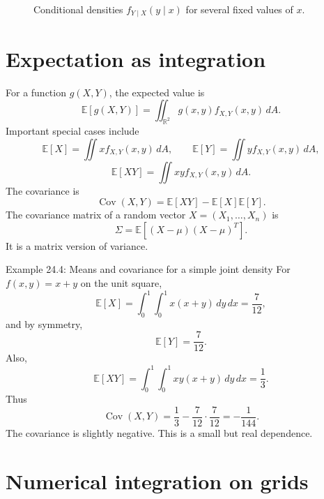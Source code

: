 \documentclass[11pt,oneside]{book}
\newcommand{\R}{\mathbb R}
\newcommand{\E}{\mathbb E}
\newcommand{\Cov}{\operatorname{Cov}}
\newcommand{\dd}{\,d}
\begin{document}
\begin{figure}[H]
\centering
{}
\caption{Conditional densities $f_{Y\mid X}(y\mid x)$ for several fixed values of $x$.}
\end{figure}

\section{Expectation as integration}

For a function $g(X,Y)$, the expected value is
\[
\E[g(X,Y)]=\iint_{\R^2}g(x,y)f_{X,Y}(x,y)\dd A.
\]
Important special cases include
\[
\E[X]=\iint x f_{X,Y}(x,y)\dd A,
\qquad
\E[Y]=\iint y f_{X,Y}(x,y)\dd A,
\]
\[
\E[XY]=\iint xy f_{X,Y}(x,y)\dd A.
\]
The covariance is
\[
\Cov(X,Y)=\E[XY]-\E[X]\E[Y].
\]
The covariance matrix of a random vector $X=(X_1,\ldots,X_n)$ is
\[
\Sigma=\E[(X-\mu)(X-\mu)^T].
\]
It is a matrix version of variance.

\begin{examplebox}{Example 24.4: Means and covariance for a simple joint density}
For $f(x,y)=x+y$ on the unit square,
\[
\E[X]=\int_0^1\int_0^1 x(x+y)\dd y\dd x=\frac{7}{12},
\]
and by symmetry,
\[
\E[Y]=\frac{7}{12}.
\]
Also,
\[
\E[XY]=\int_0^1\int_0^1 xy(x+y)\dd y\dd x=\frac13.
\]
Thus
\[
\Cov(X,Y)=\frac13-\frac{7}{12}\cdot\frac{7}{12}=-\frac{1}{144}.
\]
The covariance is slightly negative. This is a small but real dependence.
\end{examplebox}

\section{Numerical integration on grids}
\end{document}
